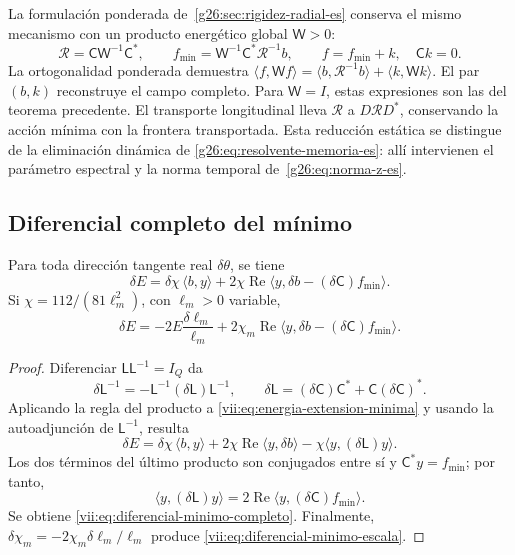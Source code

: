 La formulación ponderada de~\ref{g26:sec:rigidez-radial-es} conserva
el mismo mecanismo con un producto energético global \(\mathsf W>0\):
\[
 \mathcal R=\mathsf C\mathsf W^{-1}\mathsf C^*,\qquad
 f_{\min}=\mathsf W^{-1}\mathsf C^*\mathcal R^{-1}b,
 \qquad f=f_{\min}+k,\quad \mathsf Ck=0.
\]
La ortogonalidad ponderada demuestra
\(\langle f,\mathsf Wf\rangle
=\langle b,\mathcal R^{-1}b\rangle+\langle k,\mathsf Wk\rangle\).
El par \((b,k)\) reconstruye el campo completo. Para \(\mathsf W=I\),
estas expresiones son las del teorema precedente. El transporte
longitudinal lleva \(\mathcal R\) a \(D\mathcal RD^*\), conservando
la acción mínima con la frontera transportada. Esta reducción estática
se distingue de la eliminación dinámica de
\eqref{g26:eq:resolvente-memoria-es}: allí intervienen el parámetro
espectral y la norma temporal de~\eqref{g26:eq:norma-z-es}.

\subsection{Diferencial completo del mínimo}
\label{vii:subsec:diferencial-minimo}

\begin{theorem}
\label{vii:thm:diferencial-minimo}
Para toda dirección tangente real \(\delta\theta\), se tiene
\begin{equation}
 \delta E
 =\delta\chi\,\langle b,y\rangle
   +2\chi\operatorname{Re}
       \langle y,\delta b-(\delta\mathsf C)f_{\min}\rangle.
 \label{vii:eq:diferencial-minimo-completo}
\end{equation}
Si \(\chi=112/(81\ell_m^2)\), con \(\ell_m>0\) variable,
\begin{equation}
 \delta E=-2E\frac{\delta\ell_m}{\ell_m}
 +2\chi_m\operatorname{Re}
       \langle y,\delta b-(\delta\mathsf C)f_{\min}\rangle.
 \label{vii:eq:diferencial-minimo-escala}
\end{equation}
\end{theorem}

\begin{proof}
Diferenciar \(\mathsf L\mathsf L^{-1}=I_Q\) da
\[
 \delta\mathsf L^{-1}
 =-\mathsf L^{-1}(\delta\mathsf L)\mathsf L^{-1},\qquad
 \delta\mathsf L=(\delta\mathsf C)\mathsf C^*
                      +\mathsf C(\delta\mathsf C)^*.
\]
Aplicando la regla del producto a \eqref{vii:eq:energia-extension-minima}
y usando la autoadjunción de \(\mathsf L^{-1}\), resulta
\[
 \delta E=\delta\chi\,\langle b,y\rangle
 +2\chi\operatorname{Re}\langle y,\delta b\rangle
 -\chi\langle y,(\delta\mathsf L)y\rangle.
\]
Los dos términos del último producto son conjugados entre sí y
\(\mathsf C^*y=f_{\min}\); por tanto,
\[
 \langle y,(\delta\mathsf L)y\rangle
 =2\operatorname{Re}\langle y,(\delta\mathsf C)f_{\min}\rangle.
\]
Se obtiene \eqref{vii:eq:diferencial-minimo-completo}.
Finalmente, \(\delta\chi_m=-2\chi_m\delta\ell_m/\ell_m\)
produce \eqref{vii:eq:diferencial-minimo-escala}.
\end{proof}

